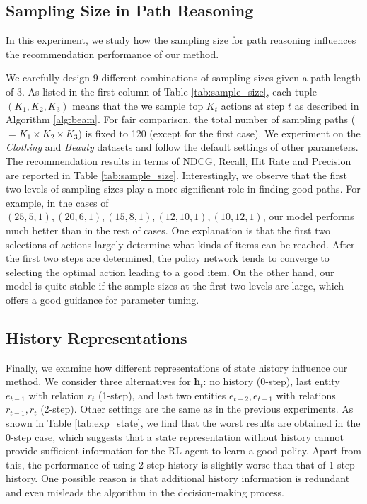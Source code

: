 \documentclass[sigconf]{acmart}
\begin{document}
\subsection{Sampling Size in Path Reasoning}
In this experiment, we study how the sampling size for path reasoning influences the recommendation performance of our method.

We carefully design 9 different combinations of sampling sizes given a path length of 3. 
As listed in the first column of Table \ref{tab:sample_size}, each tuple $(K_1, K_2, K_3)$ means that the we sample top $K_t$ actions at step $t$ as described in Algorithm \ref{alg:beam}.
For fair comparison, the total number of sampling paths ($=K_1\times K_2\times K_3$) is fixed to 120 (except for the first case).
We experiment on the \emph{Clothing} and \emph{Beauty} datasets and follow the default settings of other parameters.
The recommendation results in terms of NDCG, Recall, Hit Rate and Precision are reported in Table \ref{tab:sample_size}.
Interestingly, we observe that the first two levels of sampling sizes play a more significant role in finding good paths.
For example, in the cases of $(25,5,1), (20,6,1), (15,8,1),(12,10,1),(10,12,1)$, our model performs much better than in the rest of cases.
One explanation is that the first two selections of actions largely determine what kinds of items can be reached. After the first two steps are determined, the policy network tends to converge to selecting the optimal action leading to a good item.
On the other hand, our model is quite stable if the sample sizes at the first two levels are large, which offers a good guidance for parameter tuning.



\subsection{History Representations}
Finally, we examine how different representations of state history influence our method.
We consider three alternatives for $\mathbf{h}_t$: no history (0-step), last entity $e_{t-1}$ with relation $r_t$ (1-step), and last two entities $e_{t-2},e_{t-1}$ with relations $r_{t-1},r_{t}$ (2-step).
Other settings are the same as in the previous experiments.
As shown in Table \ref{tab:exp_state}, we find that the worst results are obtained in the 0-step case, which suggests that a state representation without history cannot provide sufficient information for the RL agent to learn a good policy.
Apart from this, the performance of using 2-step history is slightly worse than that of 1-step history. One possible reason is that additional history information is redundant and even misleads the algorithm in the decision-making process.
\end{document}
